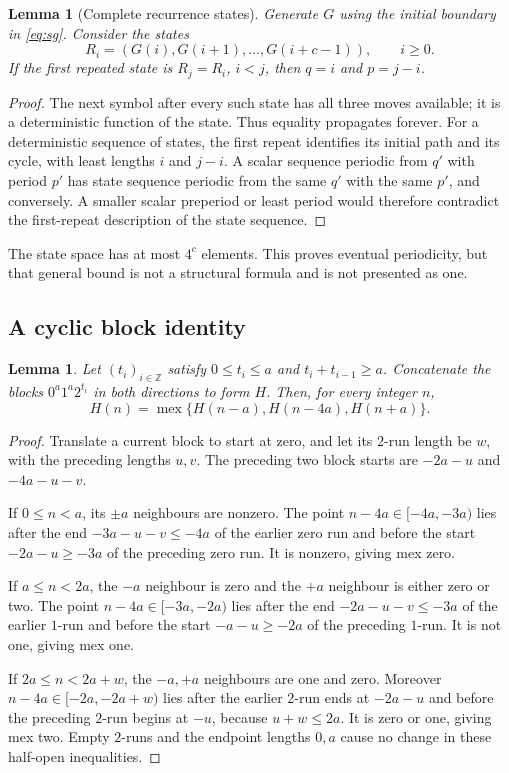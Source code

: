 \documentclass[11pt]{article}
\newtheorem{lemma}[theorem]{Lemma}
\theoremstyle{remark}\newtheorem{remark}[theorem]{Remark}
\DeclareMathOperator{\mex}{mex}
\newcommand{\Z}{\mathbb Z}
\newcommand{\half}[2]{[#1,#2)}
\begin{document}
\begin{lemma}[Complete recurrence states]\label{lem:states}
Generate $G$ using the initial boundary in \eqref{eq:sg}. Consider the states
\[R_i=(G(i),G(i+1),\ldots,G(i+c-1)),\qquad i\ge0.\]
If the first repeated state is $R_j=R_i$, $i<j$, then $q=i$ and $p=j-i$.
\end{lemma}
\begin{proof}
The next symbol after every such state has all three moves available; it is a deterministic function of the state. Thus equality propagates forever. For a deterministic sequence of states, the first repeat identifies its initial path and its cycle, with least lengths $i$ and $j-i$. A scalar sequence periodic from $q'$ with period $p'$ has state sequence periodic from the same $q'$ with the same $p'$, and conversely. A smaller scalar preperiod or least period would therefore contradict the first-repeat description of the state sequence.
\end{proof}
The state space has at most $4^c$ elements. This proves eventual periodicity, but that general bound is not a structural formula and is not presented as one.

\subsection{A cyclic block identity}
\begin{lemma}\label{lem:blocks}
Let $(t_i)_{i\in\Z}$ satisfy $0\le t_i\le a$ and $t_i+t_{i-1}\ge a$. Concatenate the blocks $0^a1^a2^{t_i}$ in both directions to form $H$. Then, for every integer $n$,
\begin{equation}\label{eq:blocks}
 H(n)=\mex\{H(n-a),H(n-4a),H(n+a)\}.
\end{equation}
\end{lemma}
\begin{proof}
Translate a current block to start at zero, and let its $2$-run length be $w$, with the preceding lengths $u,v$. The preceding two block starts are $-2a-u$ and $-4a-u-v$.

If $0\le n<a$, its $\pm a$ neighbours are nonzero. The point $n-4a\in\half{-4a}{-3a}$ lies after the end $-3a-u-v\le-4a$ of the earlier zero run and before the start $-2a-u\ge-3a$ of the preceding zero run. It is nonzero, giving mex zero.

If $a\le n<2a$, the $-a$ neighbour is zero and the $+a$ neighbour is either zero or two. The point $n-4a\in\half{-3a}{-2a}$ lies after the end $-2a-u-v\le-3a$ of the earlier $1$-run and before the start $-a-u\ge-2a$ of the preceding $1$-run. It is not one, giving mex one.

If $2a\le n<2a+w$, the $-a,+a$ neighbours are one and zero. Moreover $n-4a\in\half{-2a}{-2a+w}$ lies after the earlier $2$-run ends at $-2a-u$ and before the preceding $2$-run begins at $-u$, because $u+w\le2a$. It is zero or one, giving mex two. Empty $2$-runs and the endpoint lengths $0,a$ cause no change in these half-open inequalities.
\end{proof}
\end{document}
